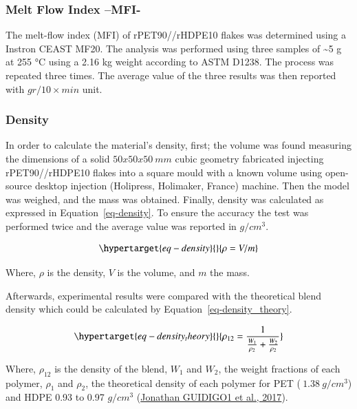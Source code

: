 \documentclass[
  12pt,
  number,
  review]{elsarticle}
\begin{document}
\hypertarget{melt-flow-index-mfi-}{%
\subsubsection{Melt Flow Index --MFI-}\label{melt-flow-index-mfi-}}

The melt-flow index (MFI) of rPET90//rHDPE10 flakes was determined using
a Instron CEAST MF20. The analysis was performed using three samples of
\textasciitilde5 g at 255 °C using a 2.16 kg weight according to ASTM
D1238. The process was repeated three times. The average value of the
three results was then reported with \(gr/10 \times min\) unit.

\hypertarget{density}{%
\subsubsection{Density}\label{density}}

In order to calculate the material's density, first; the volume was
found measuring the dimensions of a solid \(50x50x50~mm\) cubic geometry
fabricated injecting rPET90//rHDPE10 flakes into a square mould with a
known volume using open-source desktop injection (Holipress, Holimaker,
France) machine. Then the model was weighed, and the mass was obtained.
Finally, density was calculated as expressed in
Equation~\ref{eq-density}. To ensure the accuracy the test was performed
twice and the average value was reported in \(g/cm^{3}\).

\begin{equation}\protect\hypertarget{eq-density}{}{
\rho = V/m    
}\label{eq-density}\end{equation}

Where, \(\rho\) is the density, \(V\) is the volume, and \(m\) the mass.

Afterwards, experimental results were compared with the theoretical
blend density which could be calculated by
Equation~\ref{eq-density_theory}.

\begin{equation}\protect\hypertarget{eq-density_theory}{}{
\rho_{12}= \frac{1}{\frac{W_{1}}{\rho_{2}} + \frac{W_{2}}{\rho_{2}}}                                               
}\label{eq-density_theory}\end{equation}

Where, \(\rho_{12}\) is the density of the blend, \(W_{1}\) and
\(W_{2}\), the weight fractions of each polymer, \(\rho_{1}\) and
\(\rho_{2}\), the theoretical density of each polymer for PET
(\(~1.38~g/cm^{3}\)) and HDPE 0.93 to 0.97 \(g/cm^{3}\)
(\protect\hyperlink{ref-jonathanguidigo12017}{Jonathan GUIDIGO1 et al.,
2017}).
\end{document}
